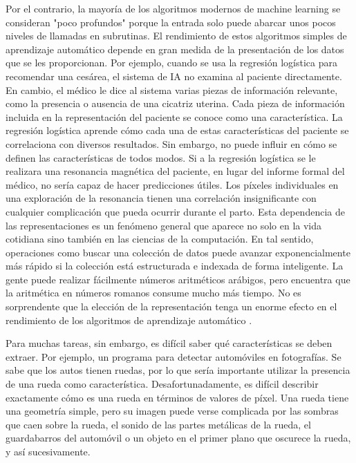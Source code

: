 	\vskip 0.4cm 
	Por el contrario, la mayoría de los algoritmos modernos de machine learning se consideran "poco profundos" porque la entrada solo puede abarcar unos pocos niveles de llamadas en subrutinas. El rendimiento de estos algoritmos simples de aprendizaje automático depende en gran medida de la presentación de los datos que se les proporcionan. Por ejemplo, cuando se usa la regresión logística para recomendar una cesárea, el sistema de IA no examina al paciente directamente. En cambio, el médico le dice al sistema varias piezas de información relevante, como la presencia o ausencia de una cicatriz uterina. Cada pieza de información incluida en la representación del paciente se conoce como una característica. La regresión logística aprende cómo cada una de estas características del paciente se correlaciona con diversos resultados. Sin embargo, no puede influir en cómo se definen las características de todos modos. Si a la regresión logística se le realizara una resonancia magnética del paciente, en lugar del informe formal del médico, no sería capaz de hacer predicciones útiles. Los píxeles individuales en una exploración de la resonancia tienen una correlación insignificante con cualquier complicación que pueda ocurrir durante el parto. Esta dependencia de las representaciones es un fenómeno general que aparece no solo en la vida cotidiana sino también en las ciencias de la computación. En tal sentido, operaciones como buscar una colección de datos puede avanzar exponencialmente más rápido si la colección está estructurada e indexada de forma inteligente. La gente puede realizar fácilmente números aritméticos arábigos, pero encuentra que la aritmética en números romanos consume mucho más tiempo. No es sorprendente que la elección de la representación tenga un enorme efecto en el rendimiento de los algoritmos de aprendizaje automático \citep{Goodfellow-et-al-2016}.

	\vskip 0.4cm 
	Para muchas tareas, sin embargo, es difícil saber qué características se deben extraer. Por ejemplo, un programa para detectar automóviles en fotografías. Se sabe que los autos tienen ruedas, por lo que sería importante utilizar la presencia de una rueda como característica. Desafortunadamente, es difícil describir exactamente cómo es una rueda en términos de valores de píxel. Una rueda tiene una geometría simple, pero su imagen puede verse complicada por las sombras que caen sobre la rueda, el sonido de las partes metálicas de la rueda, el guardabarros del automóvil o un objeto en el primer plano que oscurece la rueda, y así sucesivamente. 

